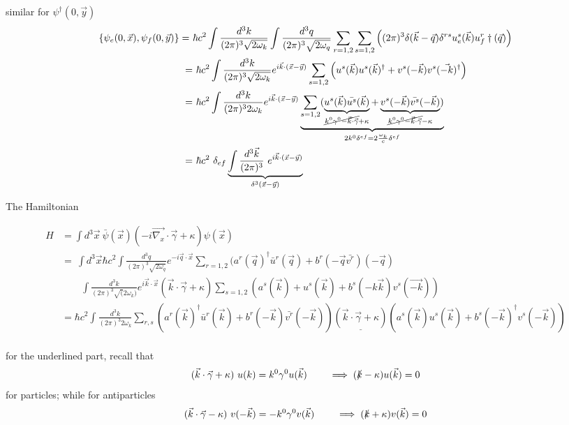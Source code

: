 \documentclass[11pt]{article}
\begin{document}
	similar for $\psi^\dagger(0, \vec{y})$ 
	\begin{align*}
		\{\psi_e(0, \vec{x}), \psi_f(0, \vec{y})\} =\ & \hbar c^2 \int \frac{d^3k}{(2\pi)^3\sqrt{2\omega_k}} \int \frac{d^3q}{(2\pi)^3 \sqrt{2\omega_q}} \sum_{r=1,2}\sum_{s=1,2} \left( (2\pi)^3 \delta(\vec{k}-\vec{q}) \delta^{rs}u_e^s(\vec{k}) u_f^r\dagger(\vec{q}) \right)\\
		=&\ \hbar c^2 \int \frac{d^3k}{(2\pi)^3\sqrt{2\omega_k}} e^{i\vec{k}\cdot(\vec{x}-\vec{y})}\sum_{s=1,2}\left( u^s(\vec{k}) u^s(\vec{k})^\dagger + v^s(-\vec{k})v^s(\vec{-k})^\dagger \right)\\
		=&\ \hbar c^2 \int \frac{d^3 k}{(2\pi)^3 2\omega_k} e^{i\vec{k}\cdot(\vec{x}-\vec{y})} \underbrace{ \sum_{s=1,2} ( \underbrace{u^s(\vec{k}) \bar{u^s}(\vec{k}) }_{\cancel{ k^0\gamma^0 - \vec{k}\cdot \vec{\gamma} } + \kappa} + \underbrace{v^s(-\vec{k}) \bar{v^s}(-\vec{k})}_{\cancel{k^0\gamma^0 - \vec{k}\cdot \vec{\gamma} }- \kappa} ) }_{2k^0 \delta^{ef} = 2\frac{\omega_k}{c}\delta^{ef}}\\
		=&\ \hbar c^2\ \delta_{ef} \underbrace{\int \frac{d^3\vec{k}}{(2\pi)^3}\  e^{i\vec{k}\cdot(\vec{x}-\vec{y})}}_{\delta^3(\vec{x}-\vec{y})}
	 \end{align*}


	The Hamiltonian
	
	\begin{align*}
		H &= \int d^3\vec{x}\ \bar{\psi}(\vec{x}) (-i\vec{\nabla_x} \cdot \vec{\gamma} + \kappa)\psi(\vec{x})\\
		&=\ \int d^3\vec{x} \hbar c^2  \int \frac{d^3q}{(2\pi)^3 \sqrt{2\omega_q}} e^{-i\vec{q}\cdot\vec{x}} \sum_{r=1,2} (a^r(\vec{q})^\dagger \bar{u}^r(\vec{q}) + b^r(-\vec{q}\bar{v^r})(-\vec{q})\\
		&  \quad \quad \int \frac{d^3 k}{(2\pi)^3 \sqrt(2\omega_k)} e^{i\vec{k}\cdot \vec{x}} (\vec{k}\cdot \vec{\gamma} +\kappa) \sum_{s=1,2}(a^s(\vec{k}) +u^s(\vec{k}) + b^s(-k\vec{k}) v^s(\vec{-k}))\\ 
		& =\hbar c^2 \int \frac{d^3k}{(2\pi)^3 2\omega_k} \sum_{r,s}(a^r(\vec{k})^\dagger \bar{u}^r(\vec{k}) + b^r(-\vec{k})\bar{v^r}(-\vec{k})) \underline{(\vec{k} \cdot \vec{\gamma} + \kappa)} (a^s(\vec{k}) u^s(\vec{k}) + b^s(-\vec{k})^\dagger v^s(-\vec{k}))\\
	\end{align*}
	
	for the underlined part, recall that \[ (\vec{k}\cdot \vec{\gamma} + \kappa)\ u(k) = k^0\gamma^0 u(\vec{k}) \quad \quad \implies (\slashed{k} - \kappa)u(\vec{k}) = 0\]
	for particles; while for antiparticles
	\[ (\vec{k}\cdot\vec{\gamma} - \kappa)\ v(-\vec{k}) = -k^0\gamma^0 v(\vec{k})  \quad \quad \implies (\slashed{k} + \kappa)v(\vec{k})=0\]

 
\end{document}
